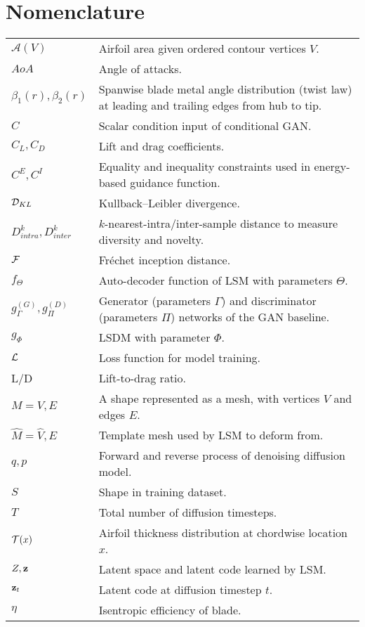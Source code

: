 \section{Nomenclature}
{\renewcommand\arraystretch{1.0}
\noindent\begin{longtable*}{@{}l @{\quad=\quad} p{0.8\textwidth}@{}}

$\mathcal{A}(V)$           & Airfoil area given ordered contour vertices $V$. \\
$AoA$           & Angle of attacks. \\
$\beta_1(r),\beta_2(r)$    & Spanwise blade metal angle distribution (twist law) at leading and trailing edges from hub to tip. \\
$C$                        & Scalar condition input of conditional GAN. \\
$C_L, C_D$                 & Lift and drag coefficients. \\
$C^E, C^I$                 & Equality and inequality constraints used in energy-based guidance function. \\
$\mathcal{D}_{KL}$                 & Kullback–Leibler divergence. \\
$D^k_{intra},D^k_{inter}$  & $k$-nearest-intra/inter-sample distance to measure diversity and novelty. \\
$\mathcal{F}$                      & Fréchet inception distance. \\
$f_\Theta$                 & Auto-decoder function of LSM with parameters $\Theta$. \\
$g_\Gamma^{(G)}, g_\Pi^{(D)}$ & Generator (parameters $\Gamma$) and discriminator (parameters $\Pi$) networks of the GAN baseline. \\
$g_\Phi$                   & LSDM with parameter $\Phi$. \\
$\mathcal{L}$                      & Loss function for model training. \\
L/D                        & Lift-to-drag ratio. \\
$M = {V, E}$               & A shape represented as a mesh, with vertices $V$ and edges $E$. \\
$\hat{M} = {\hat{V}, E}$   & Template mesh used by LSM to deform from. \\
$q, p$                     & Forward and reverse process of denoising diffusion model. \\
$S$                        & Shape in training dataset. \\
$T$                        & Total number of diffusion timesteps. \\
$\mathcal{T}(x)$                   & Airfoil thickness distribution at chordwise location $x$. \\
$Z,\mathbf{z}$                    & Latent space and latent code learned by LSM. \\
$\mathbf{z}_t$                    & Latent code at diffusion timestep $t$. \\
$\eta$                     & Isentropic efficiency of blade.

\end{longtable*}}


